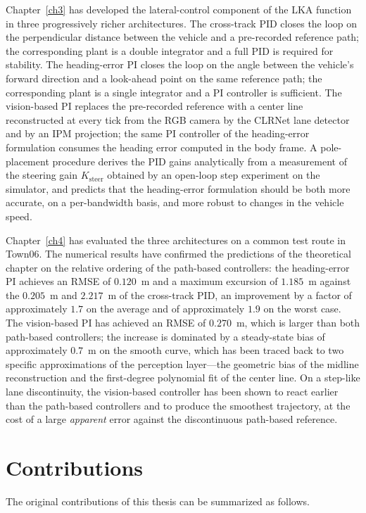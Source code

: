 Chapter~\ref{ch3} has developed the lateral-control component of the \ac{LKA} function in three progressively richer architectures. The cross-track PID closes the loop on the perpendicular distance between the vehicle and a pre-recorded reference path; the corresponding plant is a double integrator and a full PID is required for stability. The heading-error PI closes the loop on the angle between the vehicle's forward direction and a look-ahead point on the same reference path; the corresponding plant is a single integrator and a PI controller is sufficient. The vision-based PI replaces the pre-recorded reference with a center line reconstructed at every tick from the RGB camera by the CLRNet lane detector~\cite{clrnet} and by an \acs{IPM} projection; the same PI controller of the heading-error formulation consumes the heading error computed in the body frame. A pole-placement procedure derives the PID gains analytically from a measurement of the steering gain $K_{\mathrm{steer}}$ obtained by an open-loop step experiment on the simulator, and predicts that the heading-error formulation should be both more accurate, on a per-bandwidth basis, and more robust to changes in the vehicle speed.

Chapter~\ref{ch4} has evaluated the three architectures on a common test route in Town06. The numerical results have confirmed the predictions of the theoretical chapter on the relative ordering of the path-based controllers: the heading-error PI achieves an \ac{RMSE} of $0.120$~m and a maximum excursion of $1.185$~m against the $0.205$~m and $2.217$~m of the cross-track PID, an improvement by a factor of approximately $1.7$ on the average and of approximately $1.9$ on the worst case. The vision-based PI has achieved an \ac{RMSE} of $0.270$~m, which is larger than both path-based controllers; the increase is dominated by a steady-state bias of approximately $0.7$~m on the smooth curve, which has been traced back to two specific approximations of the perception layer---the geometric bias of the midline reconstruction and the first-degree polynomial fit of the center line. On a step-like lane discontinuity, the vision-based controller has been shown to react earlier than the path-based controllers and to produce the smoothest trajectory, at the cost of a large \emph{apparent} error against the discontinuous path-based reference.

\section{Contributions}
The original contributions of this thesis can be summarized as follows.

